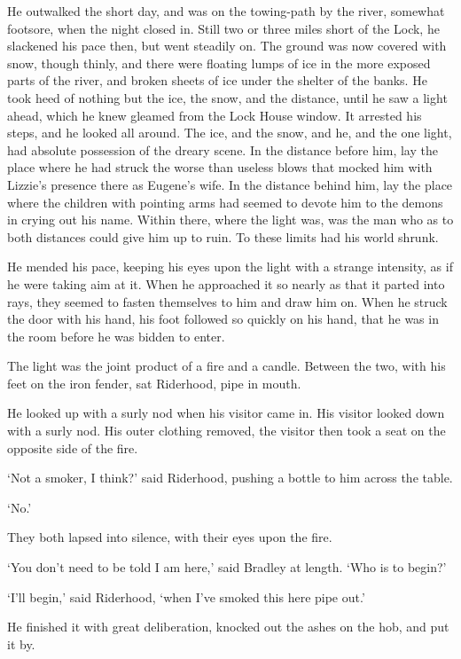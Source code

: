 He outwalked the short day, and was on the towing-path by the river,
somewhat footsore, when the night closed in. Still two or three miles
short of the Lock, he slackened his pace then, but went steadily on. The
ground was now covered with snow, though thinly, and there were floating
lumps of ice in the more exposed parts of the river, and broken sheets
of ice under the shelter of the banks. He took heed of nothing but the
ice, the snow, and the distance, until he saw a light ahead, which he
knew gleamed from the Lock House window. It arrested his steps, and he
looked all around. The ice, and the snow, and he, and the one light, had
absolute possession of the dreary scene. In the distance before him, lay
the place where he had struck the worse than useless blows that mocked
him with Lizzie’s presence there as Eugene’s wife. In the distance
behind him, lay the place where the children with pointing arms had
seemed to devote him to the demons in crying out his name. Within there,
where the light was, was the man who as to both distances could give him
up to ruin. To these limits had his world shrunk.

He mended his pace, keeping his eyes upon the light with a strange
intensity, as if he were taking aim at it. When he approached it so
nearly as that it parted into rays, they seemed to fasten themselves
to him and draw him on. When he struck the door with his hand, his foot
followed so quickly on his hand, that he was in the room before he was
bidden to enter.

The light was the joint product of a fire and a candle. Between the two,
with his feet on the iron fender, sat Riderhood, pipe in mouth.

He looked up with a surly nod when his visitor came in. His visitor
looked down with a surly nod. His outer clothing removed, the visitor
then took a seat on the opposite side of the fire.

‘Not a smoker, I think?’ said Riderhood, pushing a bottle to him across
the table.

‘No.’

They both lapsed into silence, with their eyes upon the fire.

‘You don’t need to be told I am here,’ said Bradley at length. ‘Who is
to begin?’

‘I’ll begin,’ said Riderhood, ‘when I’ve smoked this here pipe out.’

He finished it with great deliberation, knocked out the ashes on the
hob, and put it by.

